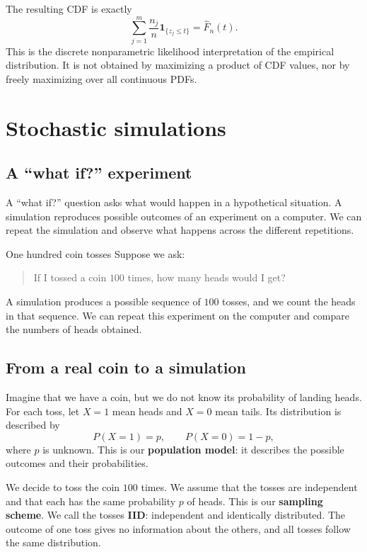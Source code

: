 \documentclass[a4paper,12pt,oneside]{report}
\begin{document}
The resulting CDF is exactly
\[
  \sum_{j=1}^m\frac{n_j}{n}\mathbf 1_{\{z_j\leq t\}}
    =\widehat F_n(t).
\]
This is the discrete nonparametric likelihood interpretation of
the empirical distribution. It is not obtained by maximizing a
product of CDF values, nor by freely maximizing over all
continuous PDFs.


\chapter{Stochastic simulations}
\label{sec:simulation}


\section{A ``what if?'' experiment}
\label{sec:simulation-what-if}
A ``what if?'' question asks what would happen in a hypothetical
situation. A simulation reproduces possible outcomes of an experiment
on a computer. We can repeat the simulation and observe what happens
across the different repetitions.

\begin{framedexample}{One hundred coin tosses}
Suppose we ask:
\begin{quote}
If I tossed a coin $100$ times, how many heads would I get?
\end{quote}
A simulation produces a possible sequence of $100$ tosses, and we
count the heads in that sequence. We can repeat this experiment
on the computer and compare the numbers of heads obtained.
\end{framedexample}

\section{From a real coin to a simulation}
Imagine that we have a coin, but we do not know its probability of
landing heads. For each toss, let $X=1$ mean heads and $X=0$ mean tails.
Its distribution is described by
\[
  P(X=1)=p,\qquad P(X=0)=1-p,
\]
where $p$ is unknown. This is our \textbf{population model}: it
describes the possible outcomes and their probabilities.

We decide to toss the coin $100$ times. We assume that the tosses are
independent and that each has the same probability $p$ of heads.
This is our \textbf{sampling scheme}. We call the tosses
\textbf{IID}: independent and identically distributed. The outcome
of one toss gives no information about the others, and all tosses
follow the same distribution.
\end{document}
